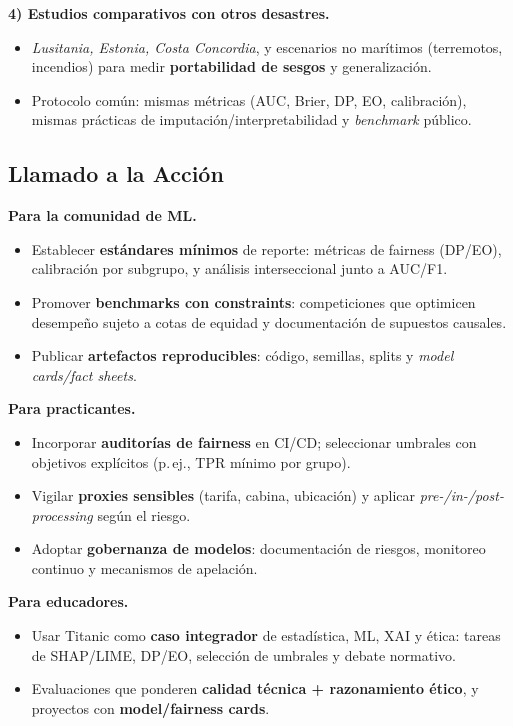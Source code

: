 \documentclass[conference]{IEEEtran}
\begin{document}
\textbf{4) Estudios comparativos con otros desastres.}
\begin{itemize}[leftmargin=*,nosep]
    \item \emph{Lusitania, Estonia, Costa Concordia}, y escenarios no marítimos (terremotos, incendios) para medir \textbf{portabilidad de sesgos} y generalización.
    \item Protocolo común: mismas métricas (AUC, Brier, DP, EO, calibración), mismas prácticas de imputación/interpretabilidad y \emph{benchmark} público.
\end{itemize}

\subsection{Llamado a la Acción}

\textbf{Para la comunidad de ML.}
\begin{itemize}[leftmargin=*,nosep]
    \item Establecer \textbf{estándares mínimos} de reporte: métricas de fairness (DP/EO), calibración por subgrupo, y análisis interseccional junto a AUC/F1.
    \item Promover \textbf{benchmarks con constraints}: competiciones que optimicen desempeño sujeto a cotas de equidad y documentación de supuestos causales.
    \item Publicar \textbf{artefactos reproducibles}: código, semillas, splits y \emph{model cards/fact sheets}.
\end{itemize}

\textbf{Para practicantes.}
\begin{itemize}[leftmargin=*,nosep]
    \item Incorporar \textbf{auditorías de fairness} en CI/CD; seleccionar umbrales con objetivos explícitos (p.\,ej., TPR mínimo por grupo).
    \item Vigilar \textbf{proxies sensibles} (tarifa, cabina, ubicación) y aplicar \emph{pre-/in-/post-processing} según el riesgo.
    \item Adoptar \textbf{gobernanza de modelos}: documentación de riesgos, monitoreo continuo y mecanismos de apelación.
\end{itemize}

\textbf{Para educadores.}
\begin{itemize}[leftmargin=*,nosep]
    \item Usar Titanic como \textbf{caso integrador} de estadística, ML, XAI y ética: tareas de SHAP/LIME, DP/EO, selección de umbrales y debate normativo.
    \item Evaluaciones que ponderen \textbf{calidad técnica + razonamiento ético}, y proyectos con \textbf{model/fairness cards}.
\end{itemize}
\end{document}

